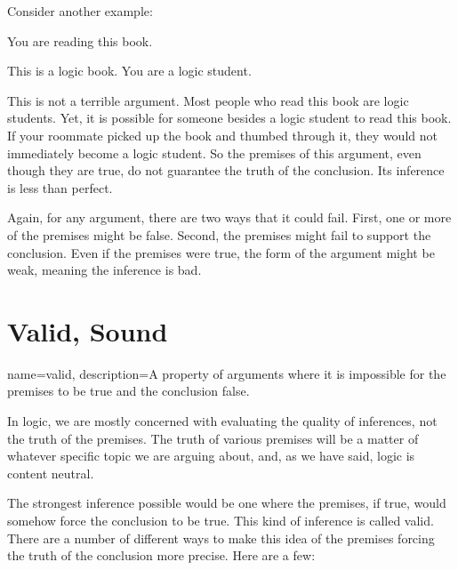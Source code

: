 Consider another example: 

\begin{earg*}
\item You are reading this book.
\item This is a logic book.
\itemc[.3] You are a logic student.
\end{earg*}

This is not a terrible argument. Most people who read this book are logic students. Yet, it is possible for someone besides a logic student to read this book. If your roommate picked up the book and thumbed through it, they would not immediately become a logic student. So the premises of this argument, even though they are true, do not guarantee the truth of the conclusion. Its inference is less than perfect.

Again, for any argument, there are two ways that it could fail. First, one or more of the premises might be false.  Second, the premises might fail to support the conclusion. Even if the premises were true, the form of the argument might be weak, meaning the inference is bad.



\section{Valid, Sound}

{
name=valid,
description={A property of arguments where it is impossible for the premises to be true and the conclusion false.}
}

In logic, we are mostly concerned with evaluating the quality of inferences, not the truth of the premises. The truth of various premises will be a matter of whatever specific topic we are arguing about, and, as we have said, logic is content neutral.

The strongest inference possible would be one where the premises, if true, would somehow force the conclusion to be true. This kind of inference is called valid. There are a number of different ways to make this idea of the premises forcing the truth of the conclusion more precise. Here are a few:
 
